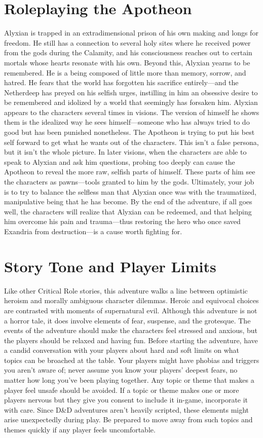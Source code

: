 \documentclass[10pt,a4paper,twoside,bg=print,twocolumn,openany,nodeprecatedcode]{dndbook}
\begin{document}
\section{Roleplaying the Apotheon}
Alyxian is trapped in an extradimensional prison of his own making and longs for freedom. He still has a connection to several holy sites where he received power from the gods during the Calamity, and his consciousness reaches out to certain mortals whose hearts resonate with his own.
Beyond this, Alyxian yearns to be remembered. He is a being composed of little more than memory, sorrow, and hatred. He fears that the world has forgotten his sacrifice entirely—and the Netherdeep has preyed on his selfish urges, instilling in him an obsessive desire to be remembered and idolized by a world that seemingly has forsaken him.
Alyxian appears to the characters several times in visions. The version of himself he shows them is the idealized way he sees himself—someone who has always tried to do good but has been punished nonetheless. The Apotheon is trying to put his best self forward to get what he wants out of the characters. This isn't a false persona, but it isn't the whole picture. In later visions, when the characters are able to speak to Alyxian and ask him questions, probing too deeply can cause the Apotheon to reveal the more raw, selfish parts of himself. These parts of him see the characters as pawns—tools granted to him by the gods.
Ultimately, your job is to try to balance the selfless man that Alyxian once was with the traumatized, manipulative being that he has become. By the end of the adventure, if all goes well, the characters will realize that Alyxian can be redeemed, and that helping him overcome his pain and trauma—thus restoring the hero who once saved Exandria from destruction—is a cause worth fighting for.
\section{Story Tone and Player Limits}
Like other Critical Role stories, this adventure walks a line between optimistic heroism and morally ambiguous character dilemmas. Heroic and equivocal choices are contrasted with moments of supernatural evil. Although this adventure is not a horror tale, it does involve elements of fear, suspense, and the grotesque.
The events of the adventure should make the characters feel stressed and anxious, but the players should be relaxed and having fun. Before starting the adventure, have a candid conversation with your players about hard and soft limits on what topics can be broached at the table. Your players might have phobias and triggers you aren't aware of; never assume you know your players' deepest fears, no matter how long you've been playing together. Any topic or theme that makes a player feel unsafe should be avoided. If a topic or theme makes one or more players nervous but they give you consent to include it in-game, incorporate it with care. Since D\&D adventures aren't heavily scripted, these elements might arise unexpectedly during play. Be prepared to move away from such topics and themes quickly if any player feels uncomfortable.
\end{document}
